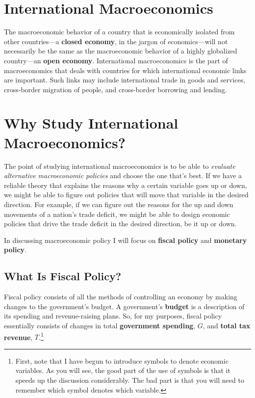 \documentclass[
  letterpaper,
]{book}
\theoremstyle{plain}
\theoremstyle{remark}
\begin{document}
\section{International Macroeconomics}\label{sec-intmac}

The macroeconomic behavior of a country that is economically isolated
from other countries---a \textbf{closed economy}, in the jargon of
economics---will not necessarily be the same as the macroeconomic
behavior of a highly globalized country---an \textbf{open economy}.
International macroeconomics is the part of macroeconomics that deals
with countries for which international economic links are important.
Such links may include international trade in goods and services,
cross-border migration of people, and cross-border borrowing and
lending.

\section{Why Study International Macroeconomics?}\label{sec-whyintmac}

The point of studying international macroeconomics is to be able to
\emph{evaluate alternative macroeconomic policies} and choose the one
that's best. If we have a reliable theory that explains the reasons why
a certain variable goes up or down, we might be able to figure out
policies that will move that variable in the desired direction. For
example, if we can figure out the reasons for the up and down movements
of a nation's trade deficit, we might be able to design economic
policies that drive the trade deficit in the desired direction, be it up
or down.

In discussing macroeconomic policy I will focus on
\textbf{fiscal policy} and \textbf{monetary policy}.

\subsection{What Is Fiscal Policy?}\label{sec-fiscal}

Fiscal policy consists of all the methods of
controlling an economy by making changes to the government's budget. A
government's \textbf{budget} is a
description of its spending and revenue-raising plans. So, for my
purposes, fiscal policy essentially consists of changes in total
\textbf{government spending}, \(G\), and
\textbf{total tax revenue}, \(T\).\footnote{First,
  note that I have begun to introduce symbols to denote economic
  variables. As you will see, the good part of the use of symbols is
  that it speeds up the discussion considerably. The bad part is that
  you will need to remember which symbol denotes which variable.}
\end{document}
